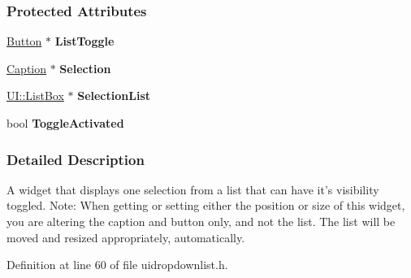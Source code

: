 \subsubsection*{Protected Attributes}
\begin{DoxyCompactItemize}
\item 
\hypertarget{classphys_1_1UI_1_1DropDownList_a7483ac2d5fb3113a2c05eae863f925c8}{
\hyperlink{classphys_1_1UI_1_1Button}{Button} $\ast$ {\bfseries ListToggle}}
\label{classphys_1_1UI_1_1DropDownList_a7483ac2d5fb3113a2c05eae863f925c8}

\item 
\hypertarget{classphys_1_1UI_1_1DropDownList_a91eee0b439bb7241ac5fd25eaa8cb554}{
\hyperlink{classphys_1_1UI_1_1Caption}{Caption} $\ast$ {\bfseries Selection}}
\label{classphys_1_1UI_1_1DropDownList_a91eee0b439bb7241ac5fd25eaa8cb554}

\item 
\hypertarget{classphys_1_1UI_1_1DropDownList_a55d5b34f7ec20da239caf1af1aad1abf}{
\hyperlink{classphys_1_1UI_1_1ListBox}{UI::ListBox} $\ast$ {\bfseries SelectionList}}
\label{classphys_1_1UI_1_1DropDownList_a55d5b34f7ec20da239caf1af1aad1abf}

\item 
\hypertarget{classphys_1_1UI_1_1DropDownList_a298f854373f5d666ef93daa2c183febe}{
bool {\bfseries ToggleActivated}}
\label{classphys_1_1UI_1_1DropDownList_a298f854373f5d666ef93daa2c183febe}

\end{DoxyCompactItemize}


\subsubsection{Detailed Description}
A widget that displays one selection from a list that can have it's visibility toggled. Note: When getting or setting either the position or size of this widget, you are altering the caption and button only, and not the list. The list will be moved and resized appropriately, automatically. 

Definition at line 60 of file uidropdownlist.h.



